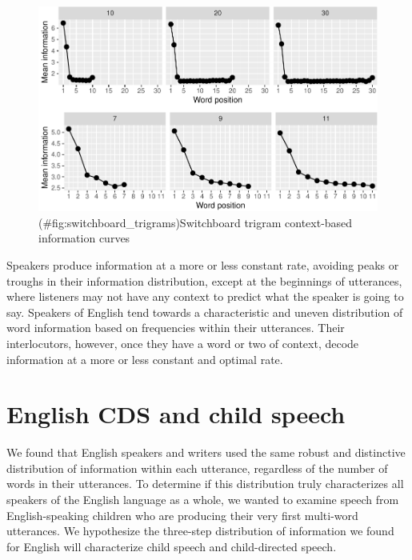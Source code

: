 \documentclass[11pt,]{article}
\begin{document}
\begin{figure}
\centering
\includegraphics{paper_files/figure-latex/switchboard_trigrams-1.pdf}
\caption{(\#fig:switchboard\_trigrams)Switchboard trigram context-based information curves}
\end{figure}

Speakers produce information at a more or less constant rate, avoiding peaks or troughs in their information distribution, except at the beginnings of utterances, where listeners may not have any context to predict what the speaker is going to say. Speakers of English tend towards a characteristic and uneven distribution of word information based on frequencies within their utterances. Their interlocutors, however, once they have a word or two of context, decode information at a more or less constant and optimal rate.

\hypertarget{english-cds-and-child-speech}{%
\section{English CDS and child speech}\label{english-cds-and-child-speech}}

We found that English speakers and writers used the same robust and distinctive distribution of information within each utterance, regardless of the number of words in their utterances. To determine if this distribution truly characterizes all speakers of the English language as a whole, we wanted to examine speech from English-speaking children who are producing their very first multi-word utterances. We hypothesize the three-step distribution of information we found for English will characterize child speech and child-directed speech.
\end{document}
